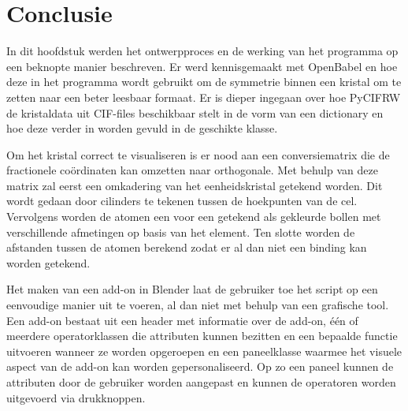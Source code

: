 \section{Conclusie}
In dit hoofdstuk werden het ontwerpproces en de werking van het programma op een beknopte manier beschreven. Er werd kennisgemaakt met OpenBabel en hoe deze in het programma wordt gebruikt om de symmetrie binnen een kristal om te zetten naar een beter leesbaar formaat. Er is dieper ingegaan over hoe PyCIFRW de kristaldata uit CIF-files beschikbaar stelt in de vorm van een dictionary en hoe deze verder in worden gevuld in de geschikte klasse.
\par
Om het kristal correct te visualiseren is er nood aan een conversiematrix die de fractionele coördinaten kan omzetten naar orthogonale. Met behulp van deze matrix zal eerst een omkadering van het eenheidskristal getekend worden. Dit wordt gedaan door cilinders te tekenen tussen de hoekpunten van de cel. Vervolgens worden de atomen een voor een getekend als gekleurde bollen met verschillende afmetingen op basis van het element. Ten slotte worden de afstanden tussen de atomen berekend zodat er al dan niet een binding kan worden getekend.
\par
Het maken van een add-on in Blender laat de gebruiker toe het script op een eenvoudige manier uit te voeren, al dan niet met behulp van een grafische tool. Een add-on bestaat uit een header met informatie over de add-on, één of meerdere operatorklassen die attributen kunnen bezitten en een bepaalde functie uitvoeren wanneer ze worden opgeroepen en een paneelklasse waarmee het visuele aspect van de add-on kan worden gepersonaliseerd. Op zo een paneel kunnen de attributen door de gebruiker worden aangepast en kunnen de operatoren worden uitgevoerd via drukknoppen.  



 



  






